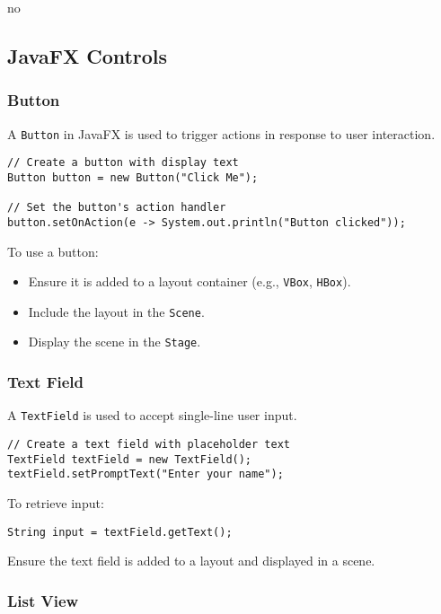 no\documentclass{article}
\newcommand{\codecmd}[1]{\textcolor[rgb]{0,0.5,0}{\texttt{#1}}}
\begin{document}
\subsection{JavaFX Controls}

\subsubsection{Button}

A \codecmd{Button} in JavaFX is used to trigger actions in response to user interaction.

\begin{verbatim}
// Create a button with display text
Button button = new Button("Click Me");

// Set the button's action handler
button.setOnAction(e -> System.out.println("Button clicked"));
\end{verbatim}

To use a button:
\begin{itemize}
    \item Ensure it is added to a layout container (e.g., \codecmd{VBox}, \codecmd{HBox}).
    \item Include the layout in the \codecmd{Scene}.
    \item Display the scene in the \codecmd{Stage}.
\end{itemize}

\subsubsection{Text Field}

A \codecmd{TextField} is used to accept single-line user input.

\begin{verbatim}
// Create a text field with placeholder text
TextField textField = new TextField();
textField.setPromptText("Enter your name");
\end{verbatim}

\noindent To retrieve input:
\begin{verbatim}
String input = textField.getText();
\end{verbatim}

Ensure the text field is added to a layout and displayed in a scene.

\subsubsection{List View}
\end{document}
